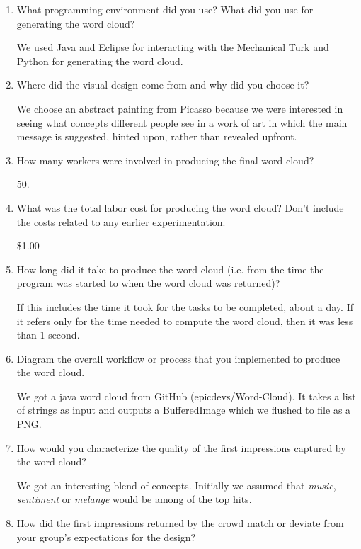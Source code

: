 \documentclass{article}
\begin{document}
\begin{enumerate}

\item What programming environment did you use? What did you use for generating the word cloud?

We used Java and Eclipse for interacting with the Mechanical Turk and Python for generating the word cloud.

\item Where did the visual design come from and why did you choose it?

We choose an abstract painting from Picasso because we were interested in seeing what concepts different people see in a work of art in which the main message is suggested, hinted upon, rather than revealed upfront.

\item How many workers were involved in producing the final word cloud?

50.

\item What was the total labor cost for producing the word cloud? Don't include the costs related to any earlier experimentation.

\$1.00

\item How long did it take to produce the word cloud (i.e. from the time the program was started to when the word cloud was returned)?

If this includes the time it took for the tasks to be completed, about  a day. If it refers only for the time needed to compute the word cloud, then it was less than 1 second.

\item Diagram the overall workflow or process that you implemented to produce the word cloud.

We got a java word cloud from GitHub (epicdevs/Word-Cloud). It takes a list of strings as input and outputs a BufferedImage which we flushed to file as a PNG.

\item How would you characterize the quality of the first impressions captured by the word cloud?

We got an interesting blend of concepts. Initially we assumed that \emph{music}, \emph{sentiment} or \emph{melange} would be among of the top hits.

\item How did the first impressions returned by the crowd match or deviate from your group's expectations for the design?


\end{enumerate}
\end{document}
